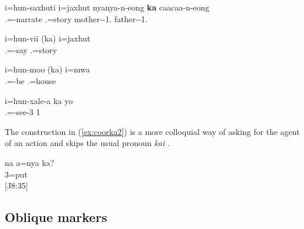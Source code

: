 \ea\label{ex:nmlz-ka1}
\gll i=hun-saxhuti i=jaxhut nyanya-n-eong \textbf{ka} caacaa-n-eong	\\
 .=-narrate .=story mother--1.   father--1.	\\
\glt {}	
\z

\ea\label{ex:nmlz-ka2}
\gll i=hun-vii (ka) i=jaxhut	\\
 .=-say  .=story	\\
\glt {}	
\z

\ea\label{ex:nmlz-ka3}
\gll i=hun-moo (ka) i=mwa\\
 .=-be  .=house\\
\glt {}
\z


\ea\label{a ka yo}
\gll	i=hun-xale-a ka yo	\\
	.=-see-3  1\\
\glt	{}
\z 


%
%
%
%
%
%
%

The construction in (\ref{ex:coorka2}) is a more colloquial way of asking for the agent of an action and skips the usual pronoun \textit{kai} . 

\ea \label{ex:coorka2}
\gll na a=nya ka?\\
  3=put \\
\glt {} {[J8:35]}
\z 

\subsection{Oblique markers}
\label{sec:oblique}

